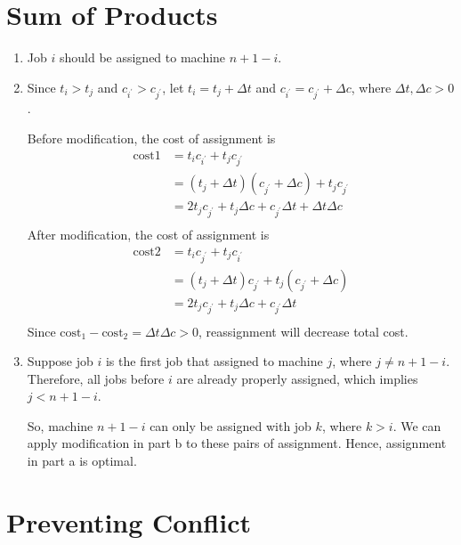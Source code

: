\documentclass[11pt]{article}
\newenvironment{qparts}{\begin{enumerate}[{(}a{)}]}{\end{enumerate}}
\begin{document}
\section{Sum of Products}
\begin{qparts}
	\item 
	
	Job $i$ should be assigned to machine $n+1-i$.
	
	\item 
	
	Since $t_i > t_j$ and $c_{i^\prime} > c_{j^\prime}$, let $t_i = t_j + \Delta t$ and $c_{i^\prime} = c_{j^\prime} + \Delta c$, where $\Delta t, \Delta c > 0$.
	
	Before modification, the cost of assignment is
	\begin{align*}
		\operatorname{cost1} 
		&= t_ic_{i^\prime} + t_jc_{j^\prime} \\
		&= (t_j + \Delta t)(c_{j^\prime} + \Delta c) +  t_jc_{j^\prime} \\
		&=  2t_jc_{j^\prime} + t_j\Delta c + c_{j^\prime}\Delta t + \Delta t \Delta c \\
	\end{align*}
	After modification, the cost of assignment is
	\begin{align*}
		\operatorname{cost2} 
		&= t_ic_{j^\prime} + t_jc_{i^\prime} \\
		&= ( t_j + \Delta t)c_{j^\prime} + t_j (c_{j^\prime} + \Delta c) \\
		&=  2t_jc_{j^\prime} + t_j\Delta c + c_{j^\prime}\Delta t \\
	\end{align*}
	Since $\operatorname{cost_1} - \operatorname{cost_2} =  \Delta t \Delta c > 0$, reassignment will decrease total cost.
	

	\item
	
	Suppose job $i$ is the first job that assigned to machine $j$, where $j \neq n+1-i$. Therefore, all jobs before $i$ are already properly assigned, which implies $j < n+1-i$.
	
	So, machine $n+1-i$ can only be assigned with job $k$, where $k > i$. We can apply modification in part b to these pairs of assignment. Hence, assignment in part a is optimal.

\end{qparts}

\newpage
\section{Preventing Conflict}
\end{document}
